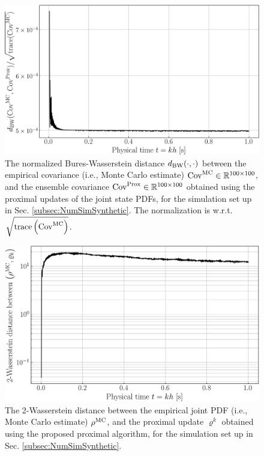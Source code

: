 \documentclass[10pt,twocolumn]{IEEEtran}
\begin{document}
\begin{figure}[t]
\centering
\includegraphics[width=0.95\linewidth]{RelErrCovMCvsProxSythetic50Gen.png}
\caption{\small{The normalized Bures-Wasserstein distance $d_{\rm{BW}}(\cdot,\cdot)$ between the empirical covariance  (i.e., Monte Carlo estimate) ${\rm{Cov}}^{\rm{MC}}\in\mathbb{R}^{100\times 100}$, and the ensemble covariance ${\rm{Cov}}^{\rm{Prox}}\in\mathbb{R}^{100\times 100}$ obtained using the proximal updates of the joint state PDFs, for the simulation set up in Sec. \ref{subsec:NumSimSynthetic}. The normalization is w.r.t. $\sqrt{{\rm{trace}}\left({\rm{Cov}}^{\rm{MC}}\right)}$.}}
\vspace*{-0.2in}
\label{fig:RelErrCovSynthetic}
\end{figure}
\begin{figure}[t]
\centering
\includegraphics[width=0.95\linewidth]{WassMCvsProxSythetic50Gen.png}
\caption{\small{The 2-Wasserstein distance between the empirical joint PDF (i.e., Monte Carlo estimate) $\rho^{\rm{MC}}$, and the proximal update $\varrho^{k}$ obtained using the proposed proximal algorithm, for the simulation set up in Sec. \ref{subsec:NumSimSynthetic}.}}
\vspace*{-0.2in}
\label{fig:WassJointPDFSynthetic}
\end{figure}
\end{document}
